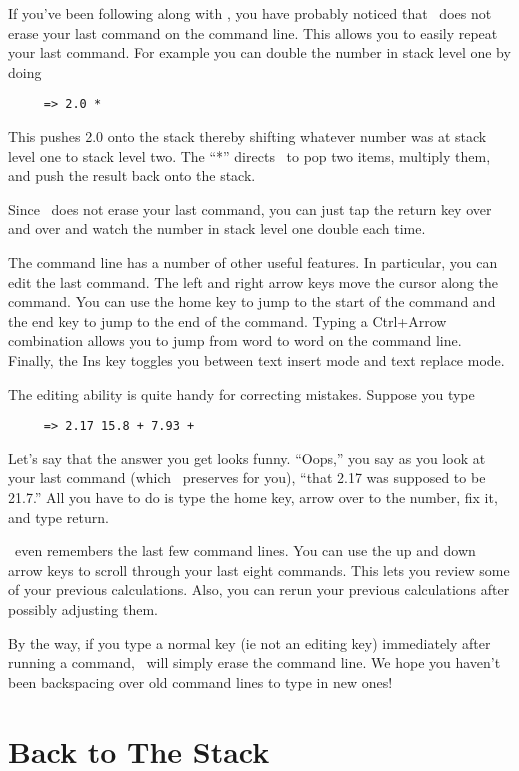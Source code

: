 \documentclass{report}
\begin{document}
If you've been following along with \CLAC, you have probably noticed that \CLAC\ does not erase
your last command on the command line. This allows you to easily repeat your last command. For
example you can double the number in stack level one by doing

\begin{verbatim}
     => 2.0 *
\end{verbatim}

This pushes 2.0 onto the stack thereby shifting whatever number was at stack level one to stack
level two. The ``*'' directs \CLAC\ to pop two items, multiply them, and push the result back
onto the stack.

Since \CLAC\ does not erase your last command, you can just tap the return key over and over and
watch the number in stack level one double each time.

The command line has a number of other useful features. In particular, you can edit the last
command. The left and right arrow keys move the cursor along the command. You can use the home
key to jump to the start of the command and the end key to jump to the end of the command.
Typing a Ctrl+Arrow combination allows you to jump from word to word on the command line.
Finally, the Ins key toggles you between text insert mode and text replace mode.

The editing ability is quite handy for correcting mistakes. Suppose you type

\begin{verbatim}
     => 2.17 15.8 + 7.93 +
\end{verbatim}

Let's say that the answer you get looks funny. ``Oops,'' you say as you look at your last
command (which \CLAC\ preserves for you), ``that 2.17 was supposed to be 21.7.'' All you have to
do is type the home key, arrow over to the number, fix it, and type return.

\CLAC\ even remembers the last few command lines. You can use the up and down arrow keys to
scroll through your last eight commands. This lets you review some of your previous
calculations. Also, you can rerun your previous calculations after possibly adjusting them.

By the way, if you type a normal key (ie not an editing key) immediately after running a
command, \CLAC\ will simply erase the command line. We hope you haven't been backspacing over
old command lines to type in new ones!

\section{Back to The Stack}
\end{document}
